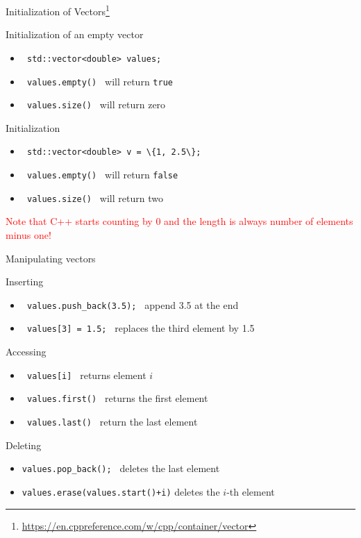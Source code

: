 \documentclass[12pt]{beamer}
\begin{document}
\begin{frame}{Initialization of Vectors\footnote{\tiny{\url{https://en.cppreference.com/w/cpp/container/vector}}}}

\begin{block}{Initialization of an empty vector}
\begin{itemize}
\item \lstinline| std::vector<double> values;| 
\item \lstinline| values.empty() | will return \lstinline|true|
\item \lstinline| values.size() | will return zero
\end{itemize}
\end{block}

\begin{block}{Initialization}
\begin{itemize}
\item \lstinline| std::vector<double> v = \{1, 2.5\}; |
\item \lstinline| values.empty() | will return \lstinline|false|
\item \lstinline| values.size() | will return two
\end{itemize}
\end{block}

\textcolor{red}{Note that C++ starts counting by 0 and the length is always number of elements minus one!}

\end{frame}

\begin{frame}{Manipulating vectors}

\begin{block}{Inserting}
\begin{itemize}
\item \lstinline| values.push_back(3.5); | append 3.5 at the end
\item \lstinline| values[3] = 1.5; | replaces the third element by 1.5
\end{itemize}
\end{block}

\begin{block}{Accessing}
\begin{itemize}
\item \lstinline| values[i] | returns element $i$
\item \lstinline| values.first() | returns the first element
\item \lstinline| values.last() | return the last element
\end{itemize}
\end{block}

\begin{block}{Deleting}
\begin{itemize}
\item \lstinline|values.pop_back(); | deletes the last element
\item \lstinline|values.erase(values.start()+i)| deletes the $i$-th element 
\end{itemize}
\end{block}

\end{frame}
\end{document}
